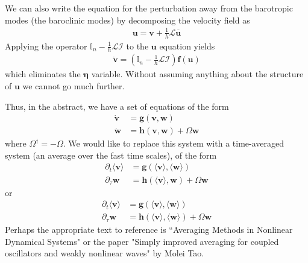 \documentclass{article}
\begin{document}
We can also write the equation for the perturbation away from the barotropic modes (the baroclinic modes) by decomposing the velocity field as 
\begin{align}
 \bm{u} = \bm{v} + \frac{1}{h}\mathcal{L}\overline{\bm{u}} 
\end{align}
Applying the operator $\mathbb{I}_n - \frac{1}{h}\mathcal{L} \mathcal{I}$ to the $\bm{u}$ equation yields
\begin{align}
    \dot{\bm{v}} = \left(\mathbb{I}_n - \frac{1}{h}\mathcal{L} \mathcal{I}\right)\bm{f}(\bm{u})
\end{align}
which eliminates the $\bm{\eta}$ variable. Without assuming anything about the structure of $\bm{u}$ we cannot go much further. 

Thus, in the abstract, we have a set of equations of the form
\begin{align}
    \dot{\bm{v}} &= \bm{g}(\bm{v}, \bm{w}) \\
    \dot{\bm{w}} &= \bm{h}(\bm{v}, \bm{w}) + \Omega \bm{w} 
\end{align}
where $\Omega^\dagger = - \Omega$.
We would like to replace this system with a time-averaged system (an average over the fast time scales), of the form
\begin{align}
     \partial_t \langle \bm{v} \rangle  &= \bm{g}(\langle \bm{v} \rangle , \langle \bm{w} \rangle ) \\
    \partial_\tau \bm{w} &= \bm{h}(\langle \bm{v} \rangle, \bm{w}) + \Omega \bm{w} 
\end{align}
or 
\begin{align}
     \partial_t \langle \bm{v} \rangle  &= \bm{g}(\langle \bm{v} \rangle , \langle \bm{w} \rangle ) \\
    \partial_\tau \bm{w} &= \bm{h}(\langle \bm{v} \rangle, 
    \langle \bm{w} \rangle ) + \Omega \bm{w} 
\end{align}
Perhaps the appropriate text to reference is ``Averaging Methods in Nonlinear Dynamical Systems" or the paper "Simply improved averaging for coupled oscillators and weakly nonlinear waves" by Molei Tao. 
\end{document}
